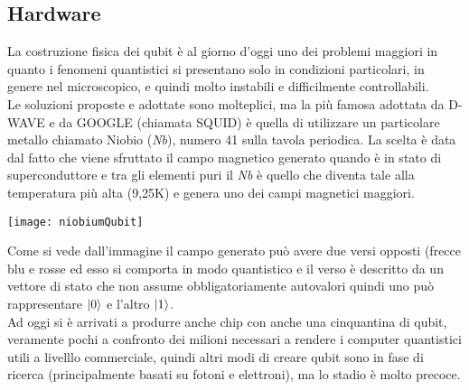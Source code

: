 \subsection{Hardware}
La costruzione fisica dei qubit è al giorno d'oggi uno dei problemi maggiori in quanto i fenomeni quantistici si presentano solo in condizioni particolari, in genere nel microscopico, e quindi molto instabili e difficilmente controllabili.\\
Le soluzioni proposte e adottate sono molteplici, ma la più famosa adottata da D-WAVE e da GOOGLE (chiamata SQUID) è quella di utilizzare un particolare metallo chiamato Niobio (\textit{Nb}), numero 41 sulla tavola periodica.
La scelta è data dal fatto che viene sfruttato il campo magnetico generato quando è in stato di superconduttore e tra gli elementi puri il \textit{Nb} è quello che diventa tale alla temperatura più alta (9,25K) e genera uno dei campi magnetici maggiori.\\
\begin{center}
\texttt{[image: niobiumQubit]}
\end{center} 
Come si vede dall'immagine il campo generato può avere due versi opposti (frecce blu e rosse ed esso si comporta in modo quantistico e il verso è descritto da un vettore di stato che non assume obbligatoriamente autovalori quindi uno può rappresentare $\ket{0}$ e l'altro $\ket{1}$.\\
Ad oggi si è arrivati a produrre anche chip con anche una cinquantina di qubit, veramente pochi a confronto dei milioni necessari a rendere i computer quantistici utili a livelllo commerciale, quindi altri modi di creare qubit sono in fase di ricerca (principalmente basati su fotoni e elettroni), ma lo stadio è molto precoce.
